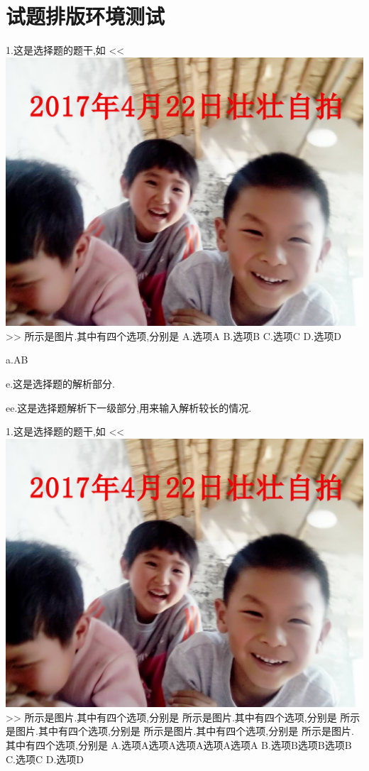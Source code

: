 \documentclass[a4paper,fontset = windowsnew]{ctexbook}
\begin{document}
\chapter{试题排版环境测试}



\begin{choices}
  1.这是选择题的题干,如
  <<
  \includegraphics[scale=0.2]{2.jpg}
  >>
  所示是图片.其中有四个选项,分别是
  A.选项A
  B.选项B
  C.选项C
  D.选项D

  a.AB

  e.这是选择题的解析部分.

  ee.这是选择题解析下一级部分,用来输入解析较长的情况.

  1.这是选择题的题干,如
  <<
  \includegraphics[scale=0.15]{2.jpg}
  >>
  所示是图片.其中有四个选项,分别是
  所示是图片.其中有四个选项,分别是
  所示是图片.其中有四个选项,分别是
  所示是图片.其中有四个选项,分别是
  所示是图片.其中有四个选项,分别是
  A.选项A选项A选项A选项A选项A
  B.选项B选项B选项B
  C.选项C
  D.选项D


\end{choices}
\end{document}
